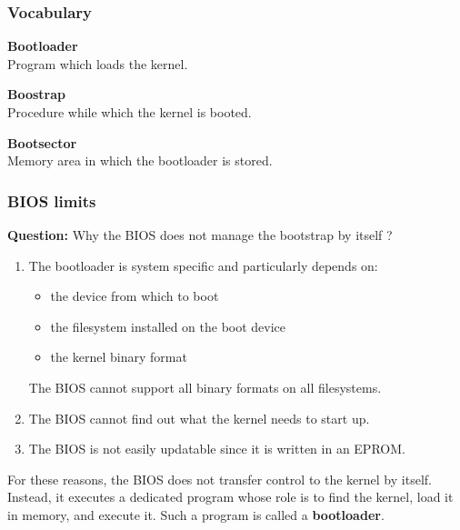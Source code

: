 %
%
%

\begin{frame}
  \frametitle{Vocabulary}

  \begin{description}
  \item {\bf Bootloader}\\
  Program which loads the kernel.

  \-

  \item {\bf Boostrap}\\
  Procedure while which the kernel is booted.

  \-

  \item {\bf Bootsector}\\
  Memory area in which the bootloader is stored.
  \end{description}

\end{frame}

%
%
%

\begin{frame}
  \frametitle{BIOS limits}

  {\bf Question:} Why the BIOS does not manage the bootstrap by itself ?

  \-

  \begin{enumerate}
  \item The bootloader is system specific and particularly depends on:

  \begin{itemize}
  \item the device from which to boot
  \item the filesystem installed on the boot device
  \item the kernel binary format
  \end{itemize}

  The BIOS cannot support all binary formats on all filesystems.

  \-

  \item The BIOS cannot find out what the kernel needs to start up.

  \-

  \item The BIOS is not easily updatable since it is written in an EPROM.

  \end{enumerate}

  \-

  For these reasons, the BIOS does not transfer control to the kernel by itself. Instead, it executes a dedicated program whose role is to find the kernel, load it in memory, and execute it. Such a program is called a {\bf bootloader}.



\end{frame}

